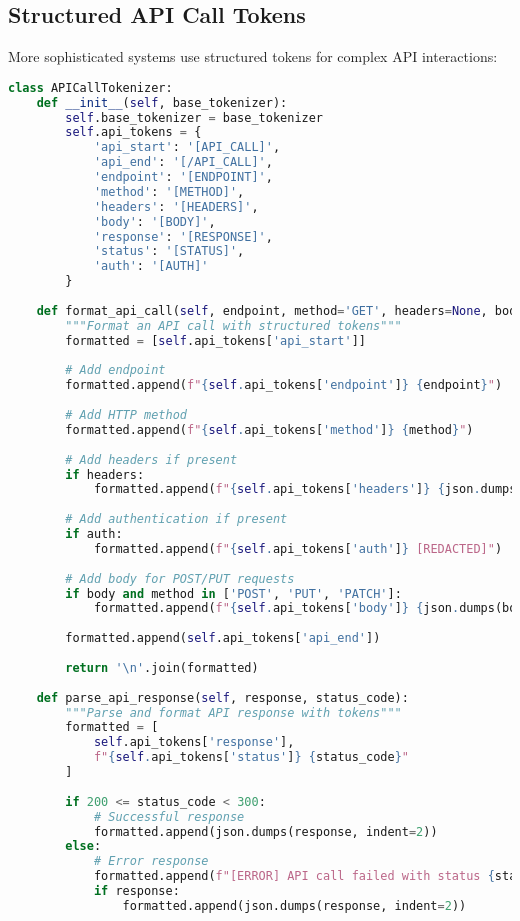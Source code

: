 \subsection{Structured API Call Tokens}

More sophisticated systems use structured tokens for complex API interactions:

\begin{lstlisting}[language=Python, caption=Structured API call tokenization]
class APICallTokenizer:
    def __init__(self, base_tokenizer):
        self.base_tokenizer = base_tokenizer
        self.api_tokens = {
            'api_start': '[API_CALL]',
            'api_end': '[/API_CALL]',
            'endpoint': '[ENDPOINT]',
            'method': '[METHOD]',
            'headers': '[HEADERS]',
            'body': '[BODY]',
            'response': '[RESPONSE]',
            'status': '[STATUS]',
            'auth': '[AUTH]'
        }
        
    def format_api_call(self, endpoint, method='GET', headers=None, body=None, auth=None):
        """Format an API call with structured tokens"""
        formatted = [self.api_tokens['api_start']]
        
        # Add endpoint
        formatted.append(f"{self.api_tokens['endpoint']} {endpoint}")
        
        # Add HTTP method
        formatted.append(f"{self.api_tokens['method']} {method}")
        
        # Add headers if present
        if headers:
            formatted.append(f"{self.api_tokens['headers']} {json.dumps(headers)}")
        
        # Add authentication if present
        if auth:
            formatted.append(f"{self.api_tokens['auth']} [REDACTED]")
        
        # Add body for POST/PUT requests
        if body and method in ['POST', 'PUT', 'PATCH']:
            formatted.append(f"{self.api_tokens['body']} {json.dumps(body)}")
        
        formatted.append(self.api_tokens['api_end'])
        
        return '\n'.join(formatted)
    
    def parse_api_response(self, response, status_code):
        """Parse and format API response with tokens"""
        formatted = [
            self.api_tokens['response'],
            f"{self.api_tokens['status']} {status_code}"
        ]
        
        if 200 <= status_code < 300:
            # Successful response
            formatted.append(json.dumps(response, indent=2))
        else:
            # Error response
            formatted.append(f"[ERROR] API call failed with status {status_code}")
            if response:
                formatted.append(json.dumps(response, indent=2))
        

\end{lstlisting}
